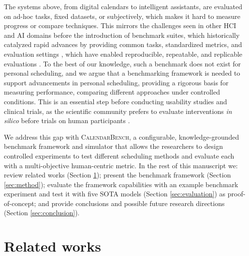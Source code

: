 \documentclass[runningheads]{llncs}
\begin{document}
The systems above, from digital calendars to intelligent assistants, are evaluated on ad-hoc tasks, fixed datasets, or subjectively, which makes it hard to measure progress or compare techniques. This mirrors the challenges seen in other HCI and AI domains before the introduction of benchmark suites, which historically catalyzed rapid advances by providing common tasks, standardized metrics, and evaluation settings  \citep{rein_gpqa_2024, hendrycks_mmlu_2021}, which have enabled reproducible, repeatable, and replicable evaluations \citep{ftgpm}. To the best of our knowledge, such a benchmark does not exist for personal scheduling, and we argue that a benchmarking framework is needed to support advancements in personal scheduling, providing a rigorous basis for measuring performance, comparing different approaches under controlled conditions. This is an essential step before conducting usability studies and clinical trials, as the scientific community prefers to evaluate interventions \textit{in silico} before trials on human participants \citep{user_simulation}.

We address this gap with \textsc{CalendarBench}, a configurable, knowledge-grounded benchmark framework and simulator that allows the researchers to design controlled experiments to test different scheduling methods and evaluate each with a multi-objective human-centric metric. In the rest of this manuscript we:  review related works (Section \ref{section:related_works});  present the benchmark framework (Section \ref{sec:method}); evaluate the  framework capabilities with an example benchmark experiment and test it with five SOTA models (Section \ref{sec:evaluation}) as proof-of-concept; and provide conclusions and possible future research directions (Section \ref{sec:conclusion}).  


\section{Related works}
\label{section:related_works}
\end{document}

